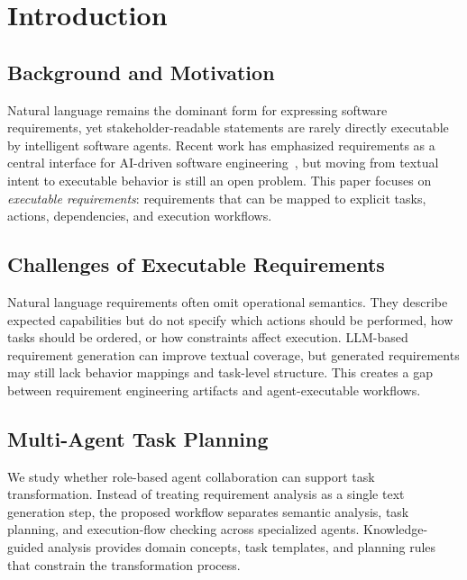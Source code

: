\section{Introduction}
\label{introduction}

\subsection{Background and Motivation}
\label{sec:intro-background}

Natural language remains the dominant form for expressing software requirements, yet stakeholder-readable statements are rarely directly executable by intelligent software agents.
Recent work has emphasized requirements as a central interface for AI-driven software engineering~\cite{robinsonRequirementsAreAll2025}, but moving from textual intent to executable behavior is still an open problem.
This paper focuses on \emph{executable requirements}: requirements that can be mapped to explicit tasks, actions, dependencies, and execution workflows.

\subsection{Challenges of Executable Requirements}
\label{sec:intro-challenges}

Natural language requirements often omit operational semantics.
They describe expected capabilities but do not specify which actions should be performed, how tasks should be ordered, or how constraints affect execution.
LLM-based requirement generation can improve textual coverage, but generated requirements may still lack behavior mappings and task-level structure.
This creates a gap between requirement engineering artifacts and agent-executable workflows.

\subsection{Multi-Agent Task Planning}
\label{sec:intro-planning}

We study whether role-based agent collaboration can support task transformation.
Instead of treating requirement analysis as a single text generation step, the proposed workflow separates semantic analysis, task planning, and execution-flow checking across specialized agents.
Knowledge-guided analysis provides domain concepts, task templates, and planning rules that constrain the transformation process.


